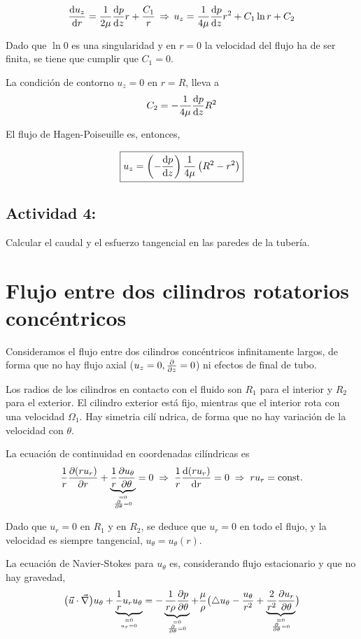 	\[
	\frac{\textrm{d} u_{z}}{\textrm{d} r}=\frac{1}{2\mu}\frac{\textrm{d} p}{\textrm{d} z}r+\frac{C_{1}}{r}\,\Rightarrow\,u_{z}=\frac{1}{4\mu}\frac{\textrm{d} p}{\textrm{d} z}r^{2}+C_{1}\ln r+C_{2}
	\]
	
	Dado que $\ln0$ es una singularidad y en $r=0$ la velocidad del
	flujo ha de ser finita, se tiene que cumplir que $C_{1}=0$.
	
	La condición de contorno $u_{z}=0$ en $r=R$, lleva a 
	\[
	C_{2}=-\frac{1}{4\mu}\frac{\textrm{d} p}{\textrm{d} z}R^{2}
	\]
	
	El flujo de Hagen-Poiseuille es, entonces, 
	
\begin{equation}
		\boxed{u_{z}=\left(-\frac{\textrm{d} p}{\textrm{d} z}\right)\frac{1}{4\mu}\left(R^{2}-r^{2}\right)}
\end{equation}
	
	
	\subsection*{Actividad 4:}
		Calcular el caudal y el esfuerzo tangencial en las paredes de la
		tubería.

\section{Flujo entre dos cilindros rotatorios concéntricos}
	
	Consideramos el flujo entre dos cilindros concéntricos infinitamente
	largos, de forma que no hay flujo axial ($u_{z}=0,\frac{\partial }{\partial z}=0$)
	ni efectos de final de tubo.
	
	Los radios de los cilindros en contacto con el fluido son $R_{1}$
	para el interior y $R_{2}$ para el exterior. El cilindro exterior
	está fijo, mientras que el interior rota con una velocidad $\Omega_{1}$.
	Hay simetria cilí ndrica, de forma que no hay variación de la velocidad
	con $\theta$.
	
	La ecuación de continuidad en coordenadas cilíndricas es 
	\[
	\frac{1}{r}\dparc{(ru_{r})}{r}+\underbrace{\frac{1}{r}\dparc{u_{\theta}}{\theta}}_{\binom{=0}{\dparc{}{\theta}=0}}=0\;\Rightarrow\;\frac{1}{r}\deriv{(ru_{r})}{r}=0\;\Rightarrow\;ru_{r}=\text{const.}
	\]
	
	
	Dado que $u_{r}=0$ en $R_{1}$ y en $R_{2}$, se deduce que $u_{r}=0$
	en todo el flujo, y la velocidad es siempre tangencial, $u_{\theta}=u_{\theta}(r)$.
	
	La ecuación de Navier-Stokes para $u_{\theta}$ es, considerando flujo
	estacionario y que no hay gravedad, 
	\[
	\bigl(\vec{u}\cdot\vec{\nabla}\bigr)u_{\theta}+\underbrace{\frac{1}{r}u_{r}u_{\theta}}_{\binom{=0}{u_{r}=0}}=-\underbrace{\frac{1}{r\rho}\dparc{p}{\theta}}_{\binom{=0}{\dparc{}{\theta}=0}}+\frac{\mu}{\rho}\bigl(\triangle u_{\theta}-\frac{u_{\theta}}{r^{2}}+\underbrace{\frac{2}{r^{2}}\dparc{u_{r}}{\theta}}_{\binom{=0}{\dparc{}{\theta}=0}}\bigr)
	\]
	
